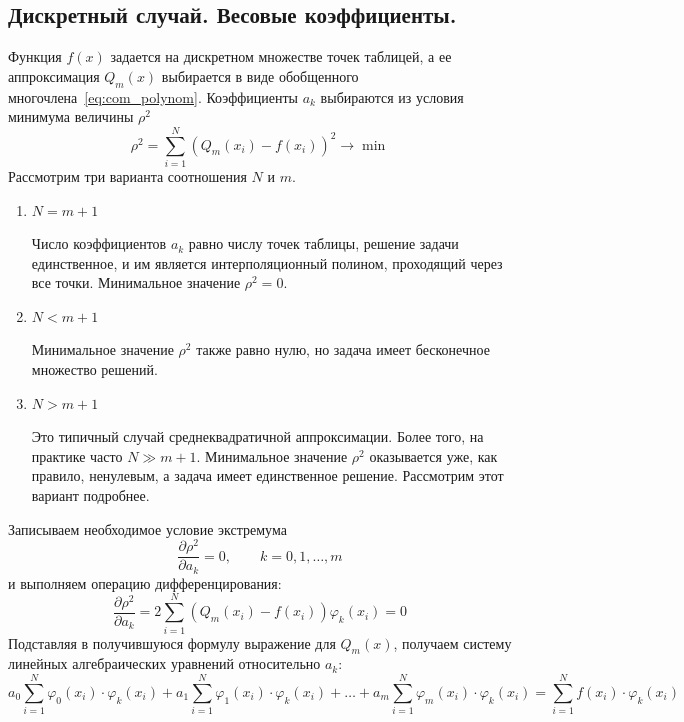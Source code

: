 \subsection{Дискретный случай. Весовые коэффициенты.}
Функция $f(x)$ задается на дискретном множестве точек таблицей, а ее
аппроксимация $Q_m(x)$ выбирается в виде обобщенного многочлена~\eqref{eq:com_polynom}.
Коэффициенты $a_k$ выбираются из условия минимума величины $\rho^2$
\begin{equation}
    \rho^2 = \sum_{i=1}^{N} \left( Q_m(x_i) - f(x_i) \right)^2 \rightarrow \min \label{eq:approx_criteria}
\end{equation}
Рассмотрим три варианта соотношения $N$ и $m$.
\begin{enumerate}
    \item $N = m + 1$

    Число коэффициентов $a_k$ равно числу точек таблицы, решение задачи
    единственное, и им является интерполяционный полином, проходящий
    через все точки. Минимальное значение $\rho^2 = 0$.
    \item $N < m + 1$

    Минимальное значение $\rho^2$ также равно нулю, но задача имеет
    бесконечное множество решений.
    \item $N > m + 1$

    Это типичный случай среднеквадратичной аппроксимации. Более того,
    на практике часто $N \gg m + 1$. Минимальное значение $\rho^2$
    оказывается уже, как правило, ненулевым, а задача имеет единственное
    решение. Рассмотрим этот вариант подробнее.
\end{enumerate}
Записываем необходимое условие экстремума
\begin{equation*}
    \frac{\partial \rho^2}{\partial a_k} = 0, \qquad k=0,1,\dots,m
\end{equation*}
и выполняем операцию дифференцирования:
\begin{equation*}
    \frac{\partial \rho^2}{\partial a_k} = 2 \sum_{i=1}^{N} \left( Q_m(x_i) - f(x_i) \right)\varphi_k(x_i) = 0
\end{equation*}
Подставляя в получившуюся формулу выражение для $Q_m(x)$, получаем систему
линейных алгебраических уравнений относительно $a_k$:
\begin{equation}
    \label{eq:approx_eqsys}
    a_0 \sum_{i=1}^{N} \varphi_0(x_i)\cdot \varphi_k(x_i) + a_1 \sum_{i=1}^{N} \varphi_1(x_i)\cdot \varphi_k(x_i) + \dots + a_m \sum_{i=1}^{N} \varphi_m(x_i) \cdot \varphi_k(x_i) = \sum_{i=1}^{N} f(x_i) \cdot \varphi_k(x_i)
\end{equation}

